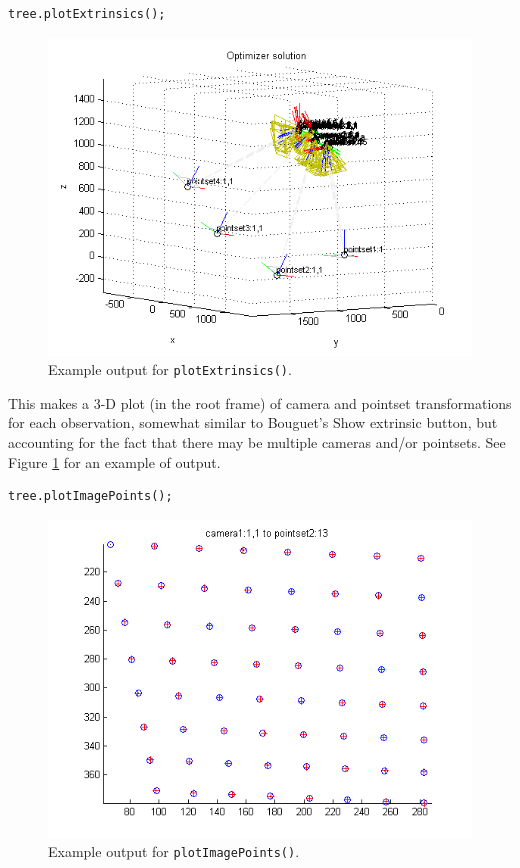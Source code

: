 \begin{verbatim}
tree.plotExtrinsics();
\end{verbatim}

\begin{figure}[t]
\includegraphics{figures/extrinsic_example}
\caption{Example output for \texttt{plotExtrinsics()}.}
\label{fig:extrinsic_example}
\end{figure}

This makes a 3-D plot (in the root frame) of camera and pointset transformations for each observation,
somewhat similar to Bouguet's \textsf{Show extrinsic} button, but accounting for 
the fact that there may be multiple cameras and/or pointsets.
See Figure \ref{fig:extrinsic_example} for an example of output.

\begin{verbatim}
tree.plotImagePoints();
\end{verbatim}

\begin{figure}[t]
\includegraphics{figures/image_example}
\caption{Example output for \texttt{plotImagePoints()}.}
\label{fig:image_example}
\end{figure}

